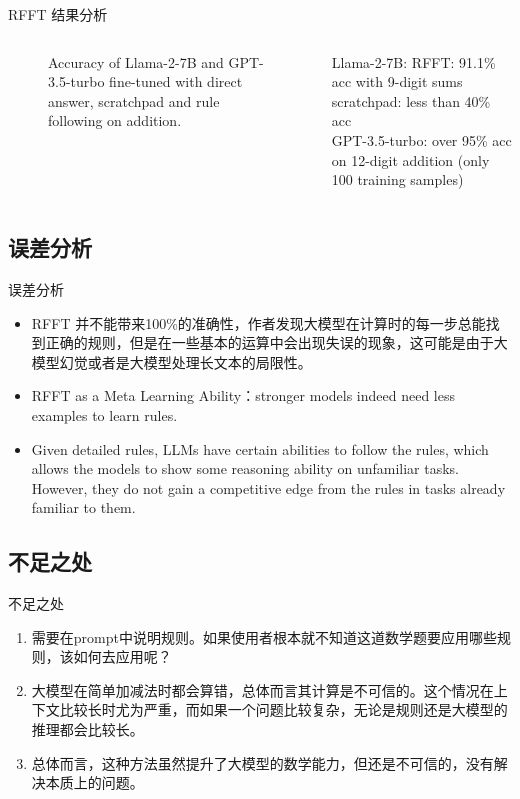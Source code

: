 \begin{frame}{RFFT 结果分析}
\begin{columns}
\begin{column}{.7\textwidth}
\begin{figure}[t]
				\caption{Accuracy of Llama-2-7B and GPT-3.5-turbo fine-tuned with direct answer, scratchpad and rule following on addition.}
				\label{fig:rfft}
				\vspace{-5pt}
			\end{figure}
		\end{column}
		\begin{column}{.3\textwidth} Llama-2-7B: RFFT: 91.1\% acc with 9-digit sums\\[0.2cm] scratchpad: less than 40\% acc\\[0.2cm] GPT-3.5-turbo: over 95\% acc on 12-digit addition (only 100 training samples) \end{column}
	\end{columns}
\end{frame}

\subsection{误差分析}
\begin{frame}{误差分析}
	\begin{itemize}
		\item RFFT 并不能带来100\%的准确性，作者发现大模型在计算时的每一步总能找到正确的规则，但是在一些基本的运算中会出现失误的现象，这可能是由于大模型幻觉或者是大模型处理长文本的局限性。\\[0.4cm]
		      \pause
		\item RFFT as a Meta Learning Ability：stronger models indeed need less examples to learn rules.\\[0.4cm]
		      \pause
		\item Given detailed rules, LLMs have certain abilities to follow the rules, which allows the models to show some reasoning ability on unfamiliar tasks. However, they do not gain a competitive edge from the rules in tasks already familiar to them.
	\end{itemize}
\end{frame}


\subsection{不足之处}
\begin{frame}{不足之处}
	\begin{enumerate}
		\item 需要在prompt中说明规则。如果使用者根本就不知道这道数学题要应用哪些规则，该如何去应用呢？
		      \pause
		\item 大模型在简单加减法时都会算错，总体而言其计算是不可信的。这个情况在上下文比较长时尤为严重，而如果一个问题比较复杂，无论是规则还是大模型的推理都会比较长。
		      \pause
		\item 总体而言，这种方法虽然提升了大模型的数学能力，但还是不可信的，没有解决本质上的问题。

	\end{enumerate}
\end{frame}